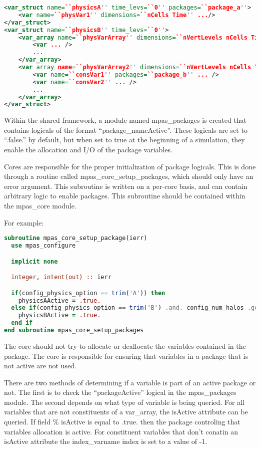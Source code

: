 \documentclass[11pt]{report}
\begin{document}
{\scriptsize
\begin{lstlisting}[language=XML]
<var_struct name=``physicsA'' time_levs=``0'' packages=``package_a''>
	<var name=``physVar1'' dimensions=``nCells Time'' .../>
</var_struct>
<var_struct name=``physicsB'' time_levs=``0''>
	<var_array name=``physVarArray'' dimensions=``nVertLevels nCells Time'' packages=``package_b''>
		<var ... />
		...
	</var_array>
	<var array name=``physVarArray2'' dimensions=``nVertLevels nCells Time''>
		<var name=``consVar1'' packages=``package_b'' ... />
		<var name=``consVar2'' ... />
		...
	</var_array>
</var_struct>
\end{lstlisting}
}

Within the shared framework, a module named mpas\_packages is created that
contains logicals of the format ``package\_nameActive''. These logicals are set
to ``.false.'' by default, but when set to true at the beginning of a
simulation, they enable the allocation and I/O of the package variables. 

Cores are responsible for the proper initialization of package logicals. This
is done through a routine called mpas\_core\_setup\_packages, which should only have
an error argument. This subroutine is written on a per-core basis, and can
contain arbitrary logic to enable packages. This subroutine should be contained
within the mpas\_core module.

For example:
{\scriptsize
\begin{lstlisting}[language=Fortran]
subroutine mpas_core_setup_package(ierr)
  use mpas_configure

  implicit none

  integer, intent(out) :: ierr

  if(config_physics_option == trim('A')) then
    physicsAActive = .true.
  else if(config_physics_option == trim('B') .and. config_num_halos .ge. 3) then
    physicsBActive = .true.
  end if
end subroutine mpas_core_setup_packages
\end{lstlisting}
}

The core should not try to allocate or deallocate the variables contained in
the package. The core is responsible for ensuring that variables in a package
that is not active are not used.

There are two methods of determining if a variable is part of an active package
or not. The first is to check the ``packageActive'' logical in the
mpas\_packages module. The second depends on what type of variable is being
queried. For all variables that are not constituents of a var\_array, the
isActive attribute can be queried. If field \% isActive is equal to .true. then
the package controling that variables allocation is active. For constituent
variables that don't conatin an isActive attribute the index\_varname index is
set to a value of -1. 
\end{document}
